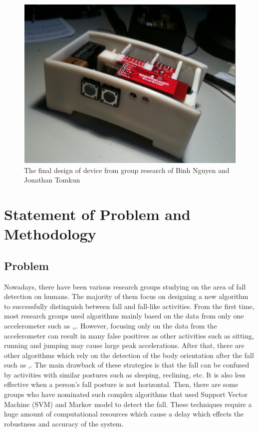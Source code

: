 \documentclass[letterpaper,12pt,titlepage,oneside,final]{book}
\begin{document}
 \begin{figure}[h!]
	\centering
	\includegraphics[scale=0.7]{binhnguyen_device}
	\caption{The final design of device from group research of Binh Nguyen and Jonathan Tomkun \cite{binh}}
\end{figure}  

\chapter{Statement of Problem and Methodology}

\section{Problem}
Nowadays, there have been various research groups studying on the area of fall detection on humans. The majority of them focus on designing a new algorithm to successfully distinguish between fall and fall-like activities. From the first time, most research groups used algorithms mainly based on the data from only one accelerometer such as \cite{only_accel_1},\cite{only_accel_2},\cite{only_accel_3}. However, focusing only on the data from the accelerometer can result in many false positives as other activities such as sitting, running and jumping may cause large peak accelerations. After that, there are other algorithms which rely on the detection of the body orientation after the fall such as \cite{body_orientation_1},\cite{body_orientation_2}. The main drawback of these strategies is that the fall can be confused by activities with similar postures such as sleeping, reclining, etc. It is also less effective when a person's fall posture is not horizontal. Then, there are some groups who have nominated such complex algorithms that used Support Vector Machine (SVM)\cite{SVM} and Markov model \cite{markov} to detect the fall. These techniques require a huge amount of computational resources which cause a delay which effects the robustness and accuracy of the system. 	
\end{document}
